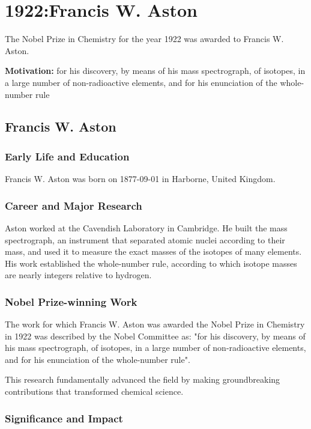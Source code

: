 \chapter{1922:Francis W. Aston}
\label{chap:chemistry1922}

The Nobel Prize in Chemistry for the year 1922 was awarded to Francis W. Aston.

\textbf{Motivation:}
for his discovery, by means of his mass spectrograph, of isotopes, in a large number of non-radioactive elements, and for his enunciation of the whole-number rule

\section{Francis W. Aston}

\subsection*{Early Life and Education}

Francis W. Aston was born on 1877-09-01 in Harborne, United Kingdom.

\subsection*{Career and Major Research}

Aston worked at the Cavendish Laboratory in Cambridge. He built the mass spectrograph, an instrument that separated atomic nuclei according to their mass, and used it to measure the exact masses of the isotopes of many elements. His work established the whole-number rule, according to which isotope masses are nearly integers relative to hydrogen.

\subsection*{Nobel Prize-winning Work}

The work for which Francis W. Aston was awarded the Nobel Prize in Chemistry in 1922 was described by the Nobel Committee as: "for his discovery, by means of his mass spectrograph, of isotopes, in a large number of non-radioactive elements, and for his enunciation of the whole-number rule".

This research fundamentally advanced the field by making groundbreaking contributions that transformed chemical science.

\subsection*{Significance and Impact}

